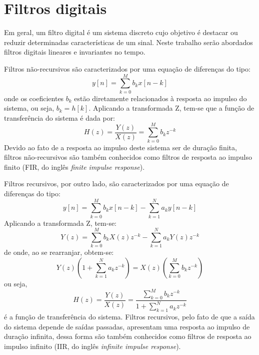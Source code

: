 \documentclass[12pt,a4paper]{report}
\begin{document}
\section{Filtros digitais}
  Em geral, um filtro digital é um sistema discreto cujo objetivo é destacar ou reduzir determinadas
  características de um sinal. Neste trabalho serão abordados filtros digitais lineares e invariantes no tempo.

  Filtros não-recursivos são caracterizados por uma equação de diferenças do tipo:
  \begin{equation}
    y[n] = \sum_{k = 0}^{M} b_k x[n - k]
  \end{equation}
  onde os coeficientes $b_k$ estão diretamente relacionados à resposta ao impulso do sistema, ou seja,
  $b_k = h[k]$. Aplicando a transformada Z, tem-se que a função de transferência do sistema é dada por:
  \begin{equation}
    H(z) = \frac{Y(z)}{X(z)} = \sum_{k = 0}^{M} b_k z^{-k}
  \end{equation}
  Devido ao fato de a resposta ao impulso deste sistema ser de duração finita, filtros não-recursivos são também
  conhecidos como filtros de resposta ao impulso finito (FIR, do inglês \textit{finite impulse response}).

  Filtros recursivos, por outro lado, são caracterizados por uma equação de diferenças do tipo:
  \begin{equation}
    y[n] = \sum_{k = 0}^{M} b_k x[n - k] - \sum_{k = 1}^{N} a_k y[n - k]
  \end{equation}
  Aplicando a transformada Z, tem-se:
  \begin{equation}
    Y(z) = \sum_{k = 0}^{M} b_k X(z) z^{-k} - \sum_{k = 1}^{N} a_k Y(z) z^{-k}
  \end{equation}
  de onde, ao se rearranjar, obtem-se:
  \begin{equation}
    Y(z) \left( 1 + \sum_{k = 1}^{N} a_k z^{-k} \right) = X(z) \left( \sum_{k = 0}^{M} b_k z^{-k} \right)
  \end{equation}
  ou seja,
  \begin{equation}
    H(z) = \frac{Y(z)}{X(z)} = \frac{\sum_{k = 0}^{M} b_k z^{-k}}{1 + \sum_{k = 1}^{N} a_k z^{-k}}
  \end{equation}
  é a função de transferência do sistema. Filtros recursivos, pelo fato de que a saída do sistema depende de
  saídas passadas, apresentam uma resposta ao impulso de duração infinita, dessa forma são também conhecidos como
  filtros de resposta ao impulso infinito (IIR, do inglês \textit{infinite impulse response}).
\end{document}
